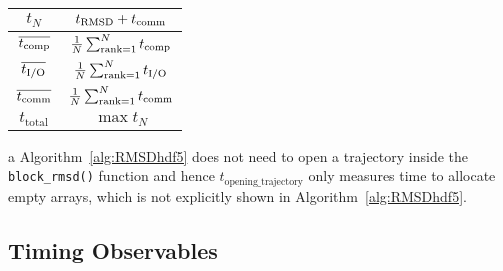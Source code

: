 \begin{SCtable}[1.0][!htb]
\begin{threeparttable}
\begin{tabular}{ccc}
    $t_{N}$ & \multicolumn{2}{c}{$t_{\text{RMSD}}+t_{\text{comm}}$} \\
    \toprule
    $\overline{{t}_{\text{comp}}}$ & \multicolumn{2}{c}{$\frac{1}{N}\sum_{\text{rank}=1}^{N} {t}_{\text{comp}}$} \\
    $\overline{{t}_{\text{I/O}}}$ & \multicolumn{2}{c}{$\frac{1}{N}\sum_{\text{rank}=1}^{N} {t}_{\text{I/O}}$}\\
    $\overline{t_{\text{comm}}}$ & \multicolumn{2}{c}{$\frac{1}{N}\sum_{\text{rank}=1}^{N} t_{\text{comm}}$} \\
    $t_{\text{total}}$ & \multicolumn{2}{c}{$\max t_{N}$} \\
    \bottomrule
  \end{tabular}
    \begin{tablenotes}
    \item [a] Algorithm~\ref{alg:RMSDhdf5} does not need to open a trajectory inside the \texttt{block\_rmsd()} function and hence $t_{\text{opening\_trajectory}}$ only measures time to allocate empty arrays, which is not explicitly shown in Algorithm~\ref{alg:RMSDhdf5}.
      \end{tablenotes}
\end{threeparttable}
\end{SCtable}


\subsection{Timing Observables}

